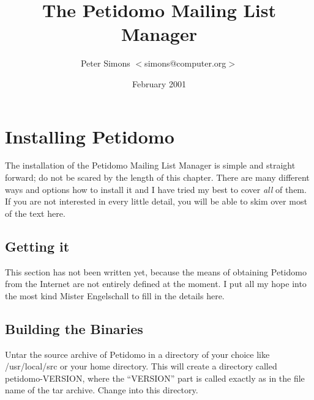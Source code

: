 \documentclass[a4paper,10pt]{scrreprt}
\newcommand{\file}[1]{{\sf #1}}
\begin{document}
\title{The Petidomo Mailing List Manager}
\author{Peter Simons $<$simons@computer.org$>$}
\date{February 2001}
\maketitle
\tableofcontents
\clearpage

\chapter{Installing Petidomo}

The installation of the Petidomo Mailing List Manager is simple and
straight forward; do not be scared by the length of this chapter.
There are many different ways and options how to install it and I have
tried my best to cover \emph{all} of them. If you are not interested
in every little detail, you will be able to skim over most of the text
here.

\section{Getting it}

    {\sf This section has not been written yet, because the means of
    obtaining Petidomo from the Internet are not entirely defined at
    the moment. I put all my hope into the most kind Mister
    Engelschall to fill in the details here. }

\section{Building the Binaries}

Untar the source archive of Petidomo in a directory of your choice
like \file{/usr/local/src} or your home directory. This will create a
directory called \file{petidomo-VERSION}, where the ``VERSION''
part is called exactly as in the file name of the tar archive. Change
into this directory.
\end{document}
